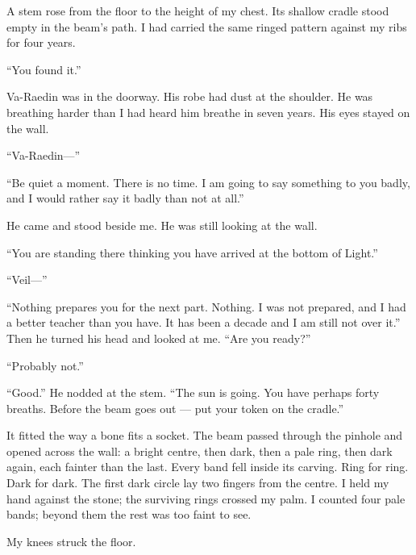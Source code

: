 A stem rose from the floor to the height of my chest. Its shallow cradle stood empty in the beam's path. I had carried the same ringed pattern against my ribs for four years.\par

\ornament

``You found it.''\par

Va-Raedin was in the doorway. His robe had dust at the shoulder. He was breathing harder than I had heard him breathe in seven years. His eyes stayed on the wall.\par

``Va-Raedin---''\par
``Be quiet a moment. There is no time. I am going to say something to you badly, and I would rather say it badly than not at all.''\par

He came and stood beside me. He was still looking at the wall. \par

``You are standing there thinking you have arrived at the bottom of Light.''\par
``Veil---''\par
``Nothing prepares you for the next part. Nothing. I was not prepared, and I had a better teacher than you have. It has been a decade and I am still not over it.'' Then he turned his head and looked at me. ``Are you ready?''\par
``Probably not.''\par
``Good.'' He nodded at the stem. ``The sun is going. You have perhaps forty breaths. Before the beam goes out --- put your token on the cradle.''\par

\ornament

It fitted the way a bone fits a socket. The beam passed through the pinhole and opened across the wall: a bright centre, then dark, then a pale ring, then dark again, each fainter than the last. Every band fell inside its carving. Ring for ring. Dark for dark. The first dark circle lay two fingers from the centre. I held my hand against the stone; the surviving rings crossed my palm. I counted four pale bands; beyond them the rest was too faint to see.\par

My knees struck the floor.\par

